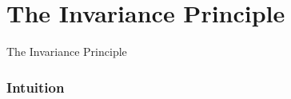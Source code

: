 \section{The Invariance Principle}

\begin{frame}
    The Invariance Principle


\end{frame}

\begingroup
\small


\begin{frame}
    \frametitle{Intuition}

    
\end{frame}


\endgroup